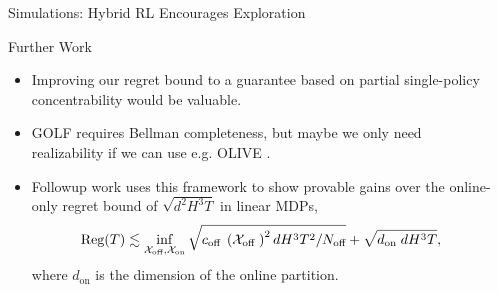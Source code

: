 \documentclass[final]{beamer}
\newcommand{\on}{\operatorname{on}}
\newlength{\sepwidth}
\newlength{\colwidth}
\newcommand{\separatorcolumn}{\begin{column}{\sepwidth}\end{column}}
\begin{document}
\begin{frame}[t]
\begin{columns}[t]
\begin{column}{\colwidth}
\begin{exampleblock}{Simulations: Hybrid RL Encourages Exploration}
    
  \end{exampleblock}

\begin{block}{Further Work}
    \begin{itemize}
        \item Improving our regret bound to a guarantee based on partial single-policy concentrability would be valuable.
        \item GOLF requires Bellman completeness, but maybe we only need realizability if we can use e.g. OLIVE \cite{du2021bilinear}.
        \item Followup work \cite{tan2024hybridreinforcementlearningbreaks} uses this framework to show provable gains over the online-only regret bound of $\sqrt{d^2H^3T}$ in linear MDPs, 
        $$\text{Reg}(T) \lesssim \inf _{\mathcal{X}_{\text {off}}, \mathcal{X}_{\text {on}}} \sqrt{c_{\text {off }}\left(\mathcal{X}_{\text {off }}\right)^2 d H^3 T^2 / N_{\text {off}}}+\sqrt{d_{\text {on }} d H^3 T},
        \vspace{-0.5ex}$$
        where $d_{\on}$ is the dimension of the online partition.
    \end{itemize}
\end{block}
\vspace{-2ex}
  
\begin{block}{}
  \vspace{-0.2em}
    \tiny{
    }
\end{block}



  \vspace{0.2em}

  

\end{column}

\separatorcolumn
\end{columns}
\end{frame}
\end{document}
